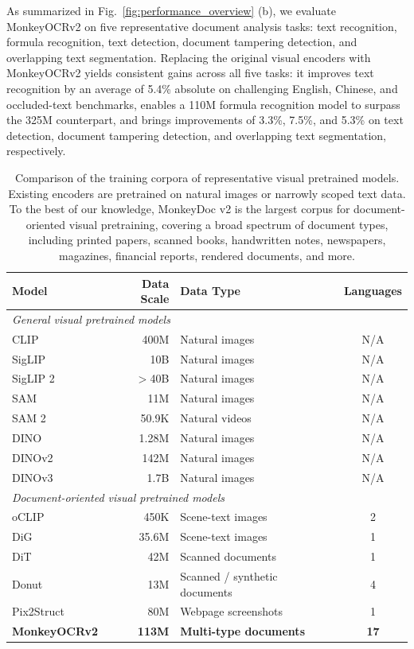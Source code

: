 \documentclass{article}
\begin{document}
As summarized in Fig.~\ref{fig:performance_overview} (b), we evaluate MonkeyOCRv2 on five representative document  analysis tasks: text recognition, formula recognition, text detection, document tampering detection, and overlapping text segmentation. Replacing the original visual encoders with MonkeyOCRv2 yields consistent gains across all five tasks: it improves text recognition by an average of 5.4\% absolute on challenging English, Chinese, and occluded-text benchmarks, enables a 110M formula recognition model to surpass the 325M counterpart, and brings improvements of 3.3\%, 7.5\%, and 5.3\% on text detection, document tampering detection, and overlapping text segmentation, respectively.

\begin{table}[t]
\centering
\caption{Comparison of the training corpora of representative visual pretrained models. Existing encoders are pretrained on natural images or narrowly scoped text data. To the best of our knowledge, MonkeyDoc v2 is the largest corpus for document-oriented visual pretraining, covering a broad spectrum of document types, including printed papers, scanned books, handwritten notes, newspapers, magazines, financial reports, rendered documents, and more.}
\label{tab:foundation_data_comparison}
\begin{tabular}{@{}lrlc@{}}
\toprule
\textbf{Model} & \textbf{Data Scale} & \textbf{Data Type} & \textbf{Languages} \\
\midrule

\multicolumn{4}{l}{\textit{General visual pretrained models}} \\
\midrule
CLIP~\cite{clip}        & 400M   & Natural images & N/A \\
SigLIP~\cite{siglip}    & 10B    & Natural images & N/A \\
SigLIP 2~\cite{siglip2} & $>$40B & Natural images & N/A \\
SAM~\cite{sam}          & 11M    & Natural images & N/A \\
SAM 2~\cite{sam2}       & 50.9K  & Natural videos & N/A \\
DINO~\cite{dino}        & 1.28M  & Natural images & N/A \\
DINOv2~\cite{dinov2}    & 142M   & Natural images & N/A \\
DINOv3~\cite{dinov3}    & 1.7B   & Natural images & N/A \\

\midrule
\multicolumn{4}{l}{\textit{Document-oriented visual pretrained models}} \\
\midrule
oCLIP~\cite{oclip}      & 450K   & Scene-text images & 2 \\
DiG~\cite{dig}          & 35.6M  & Scene-text images & 1 \\
DiT~\cite{dit}          & 42M    & Scanned documents & 1 \\
Donut~\cite{donut}      & 13M & Scanned / synthetic documents & 4 \\
Pix2Struct~\cite{pix2struct} & 80M & Webpage screenshots & 1 \\
\addlinespace[2pt]
\textbf{MonkeyOCRv2}    & \textbf{113M} & \textbf{Multi-type documents} & \textbf{17} \\


\end{tabular}
\end{table}
\end{document}
